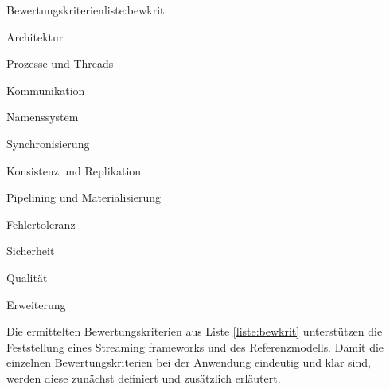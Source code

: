 \begin{itemlist}{Bewertungskriterien}{liste:bewkrit}
	\item Architektur
	\item Prozesse und Threads
	\item Kommunikation
	\item Namenssystem
	\item Synchronisierung
	\item Konsistenz und Replikation
	\item Pipelining und Materialisierung
	\item Fehlertoleranz
	\item Sicherheit
	\item Qualität
	\item Erweiterung
\end{itemlist}

Die ermittelten Bewertungskriterien aus Liste \ref{liste:bewkrit} unterstützen die Feststellung eines Streaming frameworks und des Referenzmodells. Damit die einzelnen Bewertungskriterien bei der Anwendung eindeutig und klar sind, werden diese zunächst definiert und zusätzlich erläutert.

